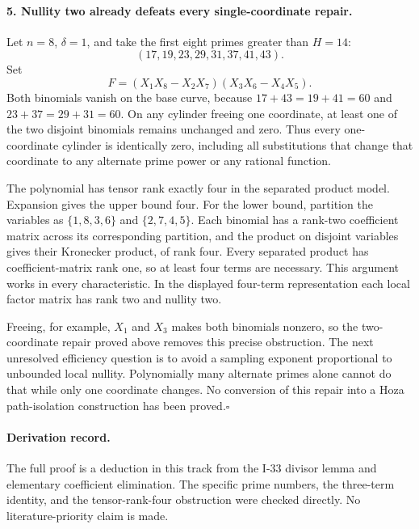 \documentclass[11pt,a4paper]{article}
\theoremstyle{definition}\newtheorem{definition}{Definition}
\begin{document}
\paragraph{5. Nullity two already defeats every single-coordinate repair.}
Let $n=8$, $\delta=1$, and take the first eight primes
greater than $H=14$:
\[
 (17,19,23,29,31,37,41,43).
\]
Set
\[
 F=(X_1X_8-X_2X_7)(X_3X_6-X_4X_5).
\]
Both binomials vanish on the base curve, because
$17+43=19+41=60$ and $23+37=29+31=60$.
On any cylinder freeing one coordinate, at least one of
the two disjoint binomials remains unchanged and zero.
Thus every one-coordinate cylinder is identically zero,
including all substitutions that change that coordinate
to any alternate prime power or any rational function.

The polynomial has tensor rank exactly four in the separated
product model. Expansion gives the upper bound four. For
the lower bound, partition the variables as
$\{1,8,3,6\}$ and $\{2,7,4,5\}$.
Each binomial has a rank-two coefficient matrix across its
corresponding partition, and the product on disjoint
variables gives their Kronecker product, of rank four.
Every separated product has coefficient-matrix rank one,
so at least four terms are necessary. This argument works
in every characteristic. In the displayed four-term
representation each local factor matrix has rank two and
nullity two.

Freeing, for example, $X_1$ and $X_3$ makes both binomials
nonzero, so the two-coordinate repair proved above removes
this precise obstruction. The next unresolved efficiency
question is to avoid a sampling exponent proportional to
unbounded local nullity. Polynomially many alternate primes
alone cannot do that while only one coordinate changes.
No conversion of this repair into a Hoza path-isolation
construction has been proved.\hfill$\square$

\paragraph{Derivation record.}
The full proof is a deduction in this track from the I-33
divisor lemma and elementary coefficient elimination.
The specific prime numbers, the three-term identity, and
the tensor-rank-four obstruction were checked directly.
No literature-priority claim is made.


\end{document}
